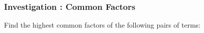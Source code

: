             \subsubsection{  Investigation : Common Factors }
            \nopagebreak
          \label{m39383*id268887}Find the highest common factors of the
following pairs of terms:\par 
    \setlength\mytablespace{10\tabcolsep}
    \addtolength\mytablespace{6\arrayrulewidth}
    \setlength\mytablewidth{\linewidth}
    \setlength\mytableroom{\mytablewidth}
    \addtolength\mytableroom{-\mytablespace}
    \setlength\myfixedwidth{0pt}
    \setlength\mystarwidth{\mytableroom}
        \addtolength\mystarwidth{-\myfixedwidth}
        \divide{}
